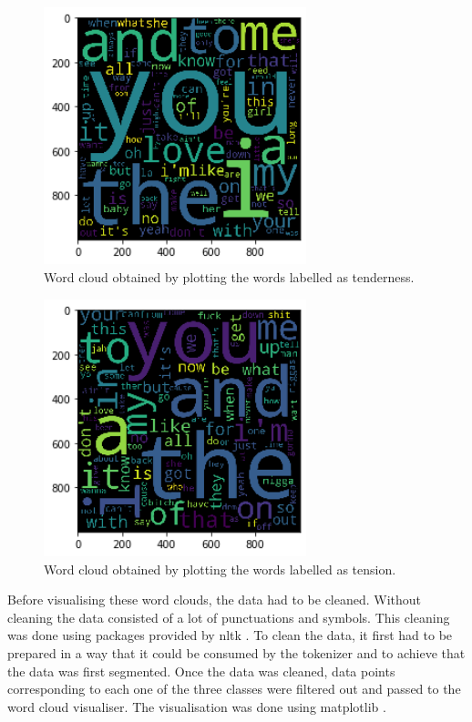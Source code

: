 \documentclass[11pt,a4paper]{article}
\begin{document}
\begin{figure}[htb]
  \begin{center}
  \includegraphics[width=3in]{4_tenderness.png}
  \caption{Word cloud obtained by plotting the words labelled as tenderness.}
  \label{tenderness}
  \end{center}
\end{figure}

\begin{figure}[htb]
  \begin{center}
  \includegraphics[width=3in]{5_tension.png}
  \caption{Word cloud obtained by plotting the words labelled as tension.}
  \label{tension}
  \end{center}
\end{figure}

Before visualising these word clouds, the data had to be cleaned. Without cleaning the data consisted of a lot of punctuations and symbols. This cleaning was done using packages provided by nltk \cite{nltk}. To clean the data, it first had to be prepared in a way that it could be consumed by the tokenizer and to achieve that the data was first segmented. Once the data was cleaned, data points corresponding to each one of the three classes were filtered out and passed to the word cloud visualiser. The visualisation was done using matplotlib \cite{matplotlib}.
\end{document}
